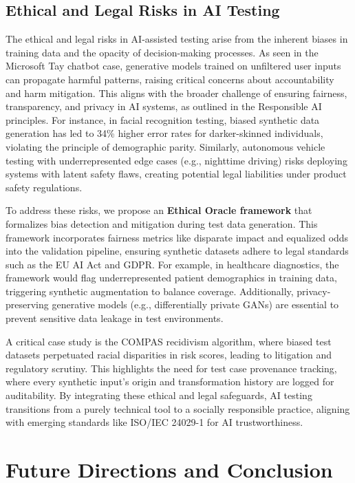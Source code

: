\documentclass[manuscript,screen,review]{acmart}
\begin{document}
\subsection{Ethical and Legal Risks in AI Testing}

The ethical and legal risks in AI-assisted testing arise from the inherent biases in training data and the opacity of decision-making processes. As seen in the Microsoft Tay chatbot case, generative models trained on unfiltered user inputs can propagate harmful patterns, raising critical concerns about accountability and harm mitigation. This aligns with the broader challenge of ensuring fairness, transparency, and privacy in AI systems, as outlined in the Responsible AI principles\cite{Zhou2024}. For instance, in facial recognition testing, biased synthetic data generation has led to 34\% higher error rates for darker-skinned individuals, violating the principle of demographic parity. Similarly, autonomous vehicle testing with underrepresented edge cases (e.g., nighttime driving) risks deploying systems with latent safety flaws, creating potential legal liabilities under product safety regulations.

To address these risks, we propose an \textbf{Ethical Oracle framework} that formalizes bias detection and mitigation during test data generation. This framework incorporates fairness metrics like disparate impact and equalized odds into the validation pipeline, ensuring synthetic datasets adhere to legal standards such as the EU AI Act and GDPR. For example, in healthcare diagnostics, the framework would flag underrepresented patient demographics in training data, triggering synthetic augmentation to balance coverage. Additionally, privacy-preserving generative models (e.g., differentially private GANs) are essential to prevent sensitive data leakage in test environments.

A critical case study is the COMPAS recidivism algorithm, where biased test datasets perpetuated racial disparities in risk scores, leading to litigation and regulatory scrutiny. This highlights the need for test case provenance tracking, where every synthetic input’s origin and transformation history are logged for auditability. By integrating these ethical and legal safeguards, AI testing transitions from a purely technical tool to a socially responsible practice, aligning with emerging standards like ISO/IEC 24029-1 for AI trustworthiness.

\section{Future Directions and Conclusion}
\end{document}
